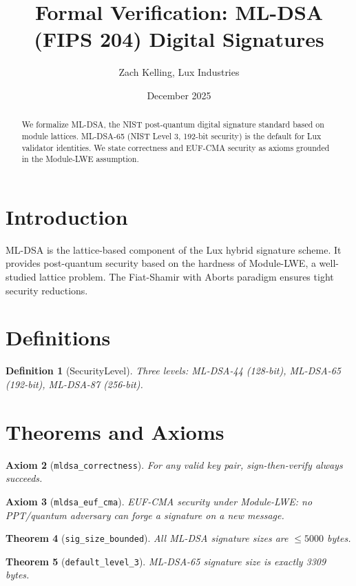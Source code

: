 \documentclass[11pt]{article}
\title{Formal Verification: ML-DSA (FIPS 204) Digital Signatures}
\author{Zach Kelling, Lux Industries}
\date{December 2025}
\newtheorem{theorem}{Theorem}
\newtheorem{definition}[theorem]{Definition}
\newtheorem{axiom_stmt}[theorem]{Axiom}
\begin{document}
\maketitle

\begin{abstract}
We formalize ML-DSA, the NIST post-quantum digital signature standard based on module lattices. ML-DSA-65 (NIST Level 3, 192-bit security) is the default for Lux validator identities. We state correctness and EUF-CMA security as axioms grounded in the Module-LWE assumption.
\end{abstract}

\section{Introduction}
ML-DSA is the lattice-based component of the Lux hybrid signature scheme. It provides post-quantum security based on the hardness of Module-LWE, a well-studied lattice problem. The Fiat-Shamir with Aborts paradigm ensures tight security reductions.

\section{Definitions}
\begin{definition}[SecurityLevel]
Three levels: ML-DSA-44 (128-bit), ML-DSA-65 (192-bit), ML-DSA-87 (256-bit).
\end{definition}


\section{Theorems and Axioms}
\begin{axiom_stmt}[\texttt{mldsa\_correctness}]
For any valid key pair, sign-then-verify always succeeds.
\end{axiom_stmt}

\begin{axiom_stmt}[\texttt{mldsa\_euf\_cma}]
EUF-CMA security under Module-LWE: no PPT/quantum adversary can forge a signature on a new message.
\end{axiom_stmt}

\begin{theorem}[\texttt{sig\_size\_bounded}]
All ML-DSA signature sizes are $\leq 5000$ bytes.
\end{theorem}

\begin{theorem}[\texttt{default\_level\_3}]
ML-DSA-65 signature size is exactly 3309 bytes.
\end{theorem}
\end{document}
